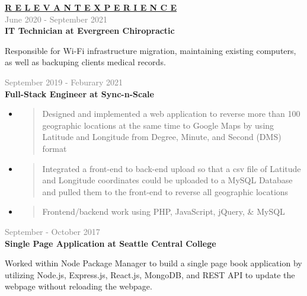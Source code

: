 \documentclass[letterpage]{article}
\begin{document}
\begin{minipage}[t]{0.61\linewidth}
\vspace{0pt}
\textbf{\fontsize{14px}{1px}\selectfont
  \ul{R E L E V A N T \:\: E X P E R I E N C E}
}\\

\vspace{7px}
\textcolor{gray}{June 2020 - September 2021}\\
\textbf{\textsf{IT Technician at Evergreen Chiropractic}}\\
\raggedright
Responsible for Wi-Fi infrastructure migration,
maintaining existing computers, as well as backuping clients medical records.

\vspace{7px}
\textcolor{gray}{September 2019 - Feburary 2021}\\
\textbf{\textsf{Full-Stack Engineer at Sync-n-Scale}}
\begin{itemize}[leftmargin=*,labelindent=1mm,labelsep=0mm]
\item
  \begin{quote}
  \raggedright
  Designed and implemented a web application to reverse more than 100 geographic locations at the same time to Google Maps by using Latitude and Longitude from Degree, Minute, and Second (DMS) format
  \end{quote}
\item
  \begin{quote}
  \raggedright
  Integrated a front-end to back-end upload so that a csv file of Latitude and Longitude coordinates could be uploaded to a MySQL Database and pulled them to the front-end to reverse all geographic locations
  \end{quote}
\item
  \begin{quote}
  \raggedright
  Frontend/backend work using PHP, JavaScript, jQuery, \& MySQL
  \end{quote}
\end{itemize}

\vspace{7px}
\textcolor{gray}{September - October 2017}\\
\textbf{\textsf{Single Page Application at Seattle Central College}}\\
\raggedright
Worked within Node Package Manager to build a single page book application by utilizing Node.js,
Express.js, React.js, MongoDB, and REST API to update the webpage without reloading the webpage.


\end{minipage}
\end{document}
